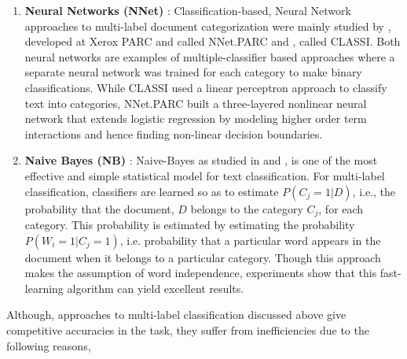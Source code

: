 \begin{enumerate}
\item{\textbf{Neural Networks (NNet)} : }Classification-based, Neural Network approaches to multi-label document categorization were mainly studied by \cite{wiener1995neural}, developed at Xerox PARC and called NNet.PARC and \cite{ng1997feature}, called CLASSI. Both neural networks are examples of multiple-classifier based approaches where a separate neural network was trained for each category to make binary classifications. While CLASSI used a linear perceptron approach to classify text into categories, NNet.PARC built a three-layered nonlinear neural network that extends logistic regression by modeling higher order term interactions and hence finding non-linear decision boundaries. 

\item{\textbf{Naive Bayes (NB)} : }Naive-Bayes as studied in \cite{lewis1992representation} and \cite{lewis1994comparison}, is one of the most effective and simple statistical model for text classification. For multi-label classification, classifiers are learned so as to estimate $P(C_{j}=1|D)$, i.e., the probability that the document, $D$ belongs to the category $C_{j}$, for each category. This probability is estimated by estimating the probability $P(W_{i}=1|C_{j}=1)$, i.e. probability that a particular word appears in the document when it belongs to a particular category. Though this approach makes the assumption of word independence, experiments show that this fast-learning algorithm can yield excellent results. 
\end{enumerate}
Although, approaches to multi-label classification discussed above give competitive accuracies in the task, they suffer from inefficiencies due to the following reasons,
